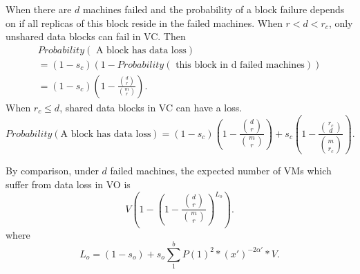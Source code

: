 When there are $d$ machines failed and the probability of
a block failure depends on if all replicas of this block reside in the failed machines.
When $r< d <r_c$,  only unshared data blocks can fail in VC. Then
\begin{multline}
Probability(\mbox{ A block has data loss})\\
= (1-s_c) (1- Probability (\mbox{ this block in d failed machines}))\\
= (1-s_c) (1- \frac{ \binom{d}{r}} { \binom{m}{r} }).
\end{multline}
When $r_c \leq d$, shared data blocks in VC can have a loss. 
\[
Probability(\mbox{A block has data loss})
= 
(1-s_c) (1- \frac{ \binom{d}{r}} { \binom{m}{r} })
+ s_c (1- \frac{ \binom{r_c}{d}} { \binom{m}{r_c} }).
\]

By comparison, under $d$ failed machines, the  expected number of VMs 
which suffer from data loss in VO is
\[
V ( 1-  (1- \frac{ \binom{d}{r}} { \binom{m}{r} })^{L_o} ).
\]
where
\[
L_o = (1-s_o) + s_o \sum_1^b  P(1)^2 *  (x')^{-2\alpha'} *V.  
\]


